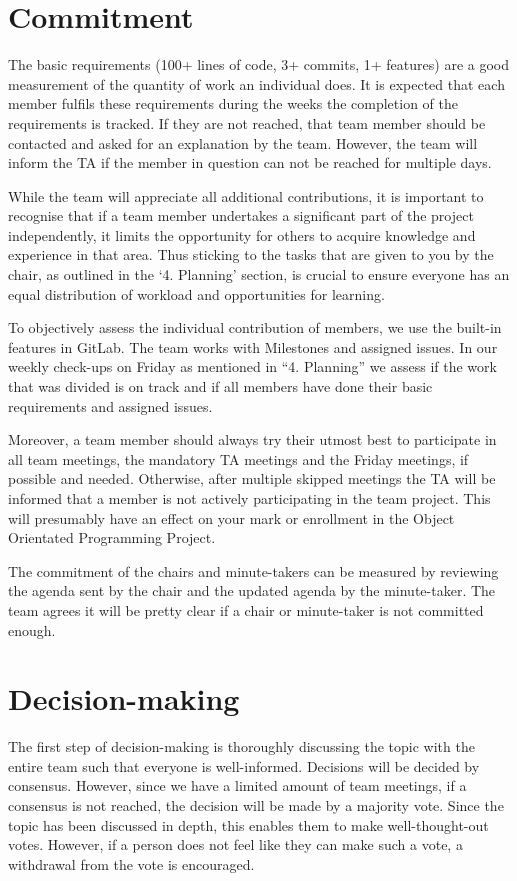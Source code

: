 \documentclass[sigconf,nonacm]{acmart}
\begin{document}
\section{Commitment}
The basic requirements (100+ lines of code, 3+ commits, 1+ features) are a good measurement of the quantity of work an individual does. It is expected that each member fulfils these requirements during the weeks the completion of the requirements is tracked. If they are not reached, that team member should be contacted and asked for an explanation by the team. However, the team will inform the TA if the member in question can not be reached for multiple days.

While the team will appreciate all additional contributions, it is important to recognise that if a team member undertakes a significant part of the project independently, it limits the opportunity for others to acquire knowledge and experience in that area. Thus sticking to the tasks that are given to you by the chair, as outlined in the ‘4. Planning’ section, is crucial to ensure everyone has an equal distribution of workload and opportunities for learning.

To objectively assess the individual contribution of members, we use the built-in features in GitLab. The team works with Milestones and assigned issues. In our weekly check-ups on Friday as mentioned in “4. Planning” we assess if the work that was divided is on track and if all members have done their basic requirements and assigned issues.

Moreover, a team member should always try their utmost best to participate in all team meetings, the mandatory TA meetings and the Friday meetings, if possible and needed. Otherwise, after multiple skipped meetings the TA will be informed that a member is not actively participating in the team project. This will presumably have an effect on your mark or enrollment in the Object Orientated Programming Project.

The commitment of the chairs and minute-takers can be measured by reviewing the agenda sent by the chair and the updated agenda by the minute-taker. The team agrees it will be pretty clear if a chair or minute-taker is not committed enough. 



\section{Decision-making}
The first step of decision-making is thoroughly discussing the topic with the entire team such that everyone is well-informed. Decisions will be decided by consensus. However, since we have a limited amount of team meetings, if a consensus is not reached, the decision will be made by a majority vote. Since the topic has been discussed in depth, this enables them to make well-thought-out votes. However, if a person does not feel like they can make such a vote, a withdrawal from the vote is encouraged.
\end{document}
